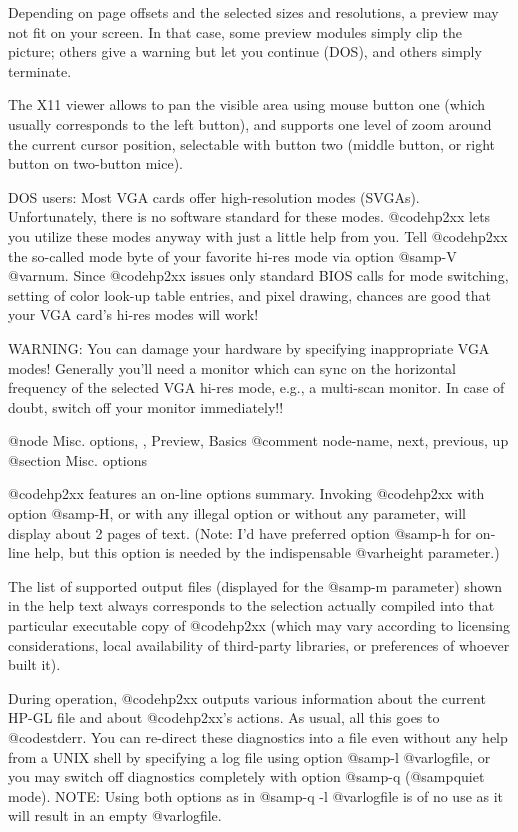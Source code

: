 Depending on page offsets and the selected sizes and resolutions, a preview
may not fit on your screen. In that case, some preview modules simply
clip the picture; others give a warning but let you continue (DOS),
and others simply terminate. 

The X11 viewer allows to pan the visible area using mouse button one (which
usually corresponds to the left button), and supports one level of zoom
around the current cursor position, selectable with button two (middle
button, or right button on two-button mice).

DOS users: Most VGA cards offer high-resolution modes (SVGAs). Unfortunately,
there is no software standard for these modes. @code{hp2xx} lets you
utilize these modes anyway with just a little help from you.
Tell @code{hp2xx} the so-called mode byte of your favorite hi-res mode
via option @samp{-V @var{num}}. Since @code{hp2xx} issues only standard
BIOS calls for mode switching, setting of color look-up table entries,
and pixel drawing, chances are good that your VGA card's hi-res modes
will work!

WARNING: You can damage your hardware by specifying inappropriate VGA modes!
Generally you'll need a monitor which can sync on the horizontal frequency
of the selected VGA hi-res mode, e.g., a multi-scan monitor. In case of
doubt, switch off your monitor immediately!!



@node Misc. options, , Preview, Basics
@comment  node-name,  next,  previous,  up
@section Misc. options

@code{hp2xx} features an on-line options summary. Invoking @code{hp2xx}
with option @samp{-H}, or with any illegal option or without any
parameter, will display about 2 pages of text. (Note: I'd have preferred
option @samp{-h} for on-line help, but this option is needed by the
indispensable @var{height} parameter.) 

The list of supported output files (displayed for the @samp{-m} parameter)
shown in the help text always corresponds to the selection actually
compiled into that particular executable copy of @code{hp2xx} (which may 
vary according to licensing considerations, local availability of third-party 
libraries, or preferences of whoever built it). 

During operation, @code{hp2xx} outputs various information about the current
HP-GL file and about @code{hp2xx}'s actions. As usual, all this goes to
@code{stderr}. You can re-direct these diagnostics into a file even without
any help from a UNIX shell by specifying a log file using option
@samp{-l @var{logfile}}, or you may switch off diagnostics completely
with option @samp{-q} (@samp{quiet} mode). NOTE: Using both options
as in @samp{-q -l @var{logfile}} is of no use as it will result in an
empty @var{logfile}.

